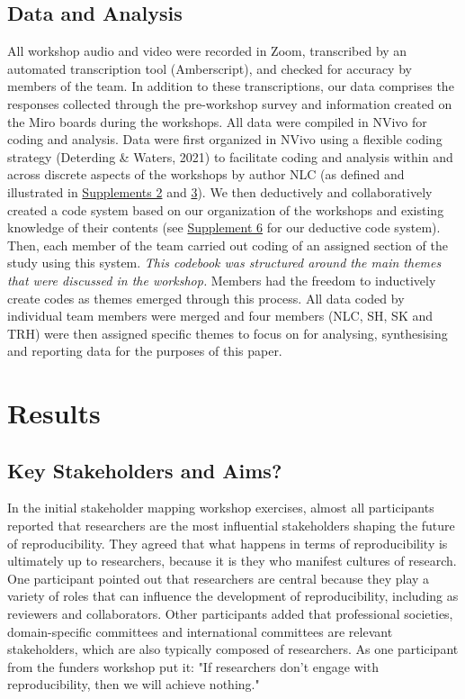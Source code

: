 \documentclass[authordate, meta]{jote-new-article}
\begin{document}
	\subsection{Data and Analysis}



	All workshop audio and video were recorded in Zoom, transcribed by an automated transcription tool (Amberscript), and checked for accuracy by members of the team. In addition to these transcriptions, our data comprises the responses collected through the pre-workshop survey and information created on the Miro boards during the workshops. All data were compiled in NVivo for coding and analysis. Data were first organized in NVivo using a flexible coding strategy (Deterding \& Waters, 2021) to facilitate coding and analysis within and across discrete aspects of the workshops by author NLC (as defined and illustrated in \href{https://osf.io/n28sg/files/d8azf}{Supplements 2} and \href{https://osf.io/n28sg/files/e4u7q}{3}). We then deductively and collaboratively created a code system based on our organization of the workshops and existing knowledge of their contents (see \href{https://osf.io/n28sg/files/4wcd7}{Supplement 6} for our deductive code system). Then, each member of the team carried out coding of an assigned section of the study using this system. \emph{This codebook was structured around the main themes that were discussed in the workshop.} Members had the freedom to inductively create codes as themes emerged through this process. All data coded by individual team members were merged and four members (NLC, SH, SK and TRH) were then assigned specific themes to focus on for analysing, synthesising and reporting data for the purposes of this paper.



	\section{Results}



	\subsection{Key Stakeholders and Aims?}



	In the initial stakeholder mapping workshop exercises, almost all participants reported that researchers are the most influential stakeholders shaping the future of reproducibility. They agreed that what happens in terms of reproducibility is ultimately up to researchers, because it is they who manifest cultures of research. One participant pointed out that researchers are central because they play a variety of roles that can influence the development of reproducibility, including as reviewers and collaborators. Other participants added that professional societies, domain-specific committees and international committees are relevant stakeholders, which are also typically composed of researchers. As one participant from the funders workshop put it: "If researchers don't engage with reproducibility, then we will achieve nothing."
\end{document}
